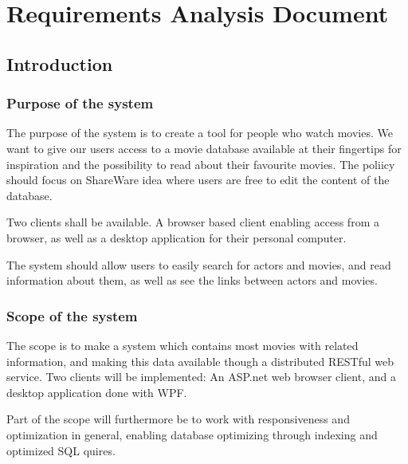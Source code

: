\chapter{Requirements Analysis Document}
\label{chap:RAD}

\section{Introduction}
\label{sec:introduction}



\subsection{Purpose of the system}

The purpose of the system is to create a tool for people who watch movies. We want to give our users access to a movie database available at their fingertips for inspiration and the possibility to read about their favourite movies. The poliicy should focus on ShareWare idea where users are free to edit the content of the database.

Two clients shall be available. A browser based client enabling access from a browser, as well as a desktop application for their personal computer.  

The system should allow users to easily search for actors and movies, and read information about them, as well as see the links between actors and movies.




\subsection{Scope of the system}

The scope is to make a system which contains most movies with related information, and making this data available though a distributed RESTful web service. Two clients will be implemented: An ASP.net web browser client, and a desktop application done with WPF.

Part of the scope will furthermore be to work with responsiveness and optimization in general, enabling database optimizing through indexing and optimized SQL quires.


